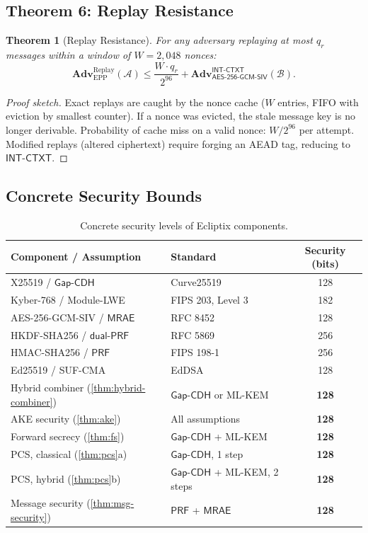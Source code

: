 \documentclass[11pt,a4paper]{article}
\newtheorem{theorem}{Theorem}[section]
\theoremstyle{definition}
\newcommand{\adv}{\mathbf{Adv}}
\newcommand{\advA}{\mathcal{A}}
\newcommand{\advB}{\mathcal{B}}
\newcommand{\AEAD}{\textsf{AES-256-GCM-SIV}}
\newcommand{\GapCDH}{\textsf{Gap-CDH}}
\newcommand{\INTCTXT}{\textsf{INT-CTXT}}
\newcommand{\MRAE}{\textsf{MRAE}}
\newcommand{\PRF}{\textsf{PRF}}
\newcommand{\dualPRF}{\textsf{dual-PRF}}
\begin{document}
\subsection{Theorem 6: Replay Resistance}

\begin{theorem}[Replay Resistance]\label{thm:replay}
For any adversary replaying at most $q_r$ messages within a window of $W = 2{,}048$ nonces:
\[
  \adv^{\mathrm{Replay}}_{\mathrm{EPP}}(\advA) \leq \frac{W \cdot q_r}{2^{96}} + \adv^{\INTCTXT}_{\AEAD}(\advB).
\]
\end{theorem}

\begin{proof}[Proof sketch]
Exact replays are caught by the nonce cache ($W$ entries, FIFO with eviction by smallest counter). If a nonce was evicted, the stale message key is no longer derivable. Probability of cache miss on a valid nonce: $W/2^{96}$ per attempt. Modified replays (altered ciphertext) require forging an AEAD tag, reducing to $\INTCTXT$.
\end{proof}

\subsection{Concrete Security Bounds}

\begin{table}[t]
\centering
\caption{Concrete security levels of Ecliptix components.}\label{tab:bounds}
\small
\begin{tabular}{@{}llc@{}}
\toprule
Component / Assumption & Standard & Security (bits) \\
\midrule
X25519 / $\GapCDH$ & Curve25519 & 128 \\
Kyber-768 / Module-LWE & FIPS 203, Level 3 & 182 \\
AES-256-GCM-SIV / $\MRAE$ & RFC 8452 & 128 \\
HKDF-SHA256 / $\dualPRF$ & RFC 5869 & 256 \\
HMAC-SHA256 / $\PRF$ & FIPS 198-1 & 256 \\
Ed25519 / SUF-CMA & EdDSA & 128 \\
\midrule
Hybrid combiner (\cref{thm:hybrid-combiner}) & $\GapCDH$ or ML-KEM & \textbf{128} \\
AKE security (\cref{thm:ake}) & All assumptions & \textbf{128} \\
Forward secrecy (\cref{thm:fs}) & $\GapCDH$ + ML-KEM & \textbf{128} \\
PCS, classical (\cref{thm:pcs}a) & $\GapCDH$, 1 step & \textbf{128} \\
PCS, hybrid (\cref{thm:pcs}b) & $\GapCDH$ + ML-KEM, 2 steps & \textbf{128} \\
Message security (\cref{thm:msg-security}) & $\PRF$ + $\MRAE$ & \textbf{128} \\
\bottomrule
\end{tabular}
\end{table}
\end{document}
